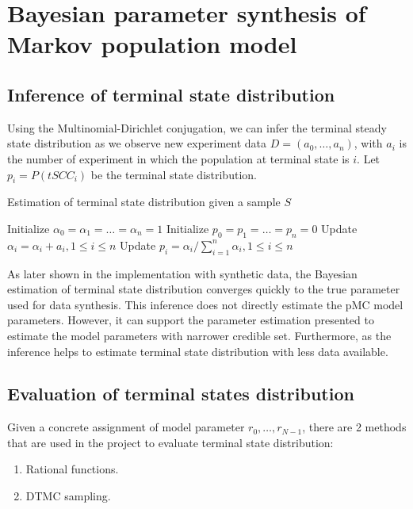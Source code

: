 \documentclass[12pt]{article}
\theoremstyle{definition}
\begin{document}
\section{Bayesian parameter synthesis of Markov population model}
\subsection{Inference of terminal state distribution}
Using the Multinomial-Dirichlet conjugation, we can infer the terminal steady state
distribution as we observe new experiment data $D=(a_0,\ldots,a_n)$, with $a_i$
is the number of experiment in which the population at terminal state is $i$.
Let $p_i = P(tSCC_i)$ be the terminal state distribution. 
\begin{algorithm}[H]
  \caption{Estimation of terminal state distribution given a sample $S$}\label{exp_a}
  \begin{algorithmic}[1]
    \State Initialize $\alpha_0=\alpha_1=\ldots=\alpha_n=1$
    \State Initialize $p_0=p_1=\ldots=p_n=0$
    \State Update $\alpha_i = \alpha_i + a_i, 1 \leq i \leq n$
    \State Update $p_i = \alpha_i / \sum_{i=1}^n \alpha_i, 1 \leq i \leq n$
    \EndProcedure
  \end{algorithmic}
\end{algorithm}

As later shown in the implementation with synthetic data, the Bayesian
estimation of terminal state distribution converges quickly to the true parameter
used for data synthesis. This inference does not directly estimate the pMC
model parameters. However, it can support the parameter estimation presented
\cite{hajnal2019data} to estimate the model parameters with narrower credible
set. Furthermore, as the inference helps to estimate terminal state distribution
with less data available.


\subsection{Evaluation of terminal states distribution}
Given a concrete assignment of model parameter $r_0,\ldots,r_{N-1}$, there are 2
methods that are used in the project to evaluate terminal state distribution:
\begin{enumerate}
\item Rational functions.
\item DTMC sampling.
\end{enumerate}
\end{document}
